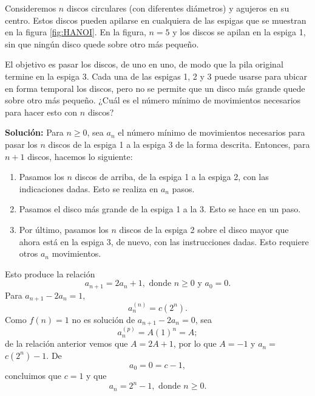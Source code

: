 \begin{myexample}
    Consideremos $n$ discos circulares (con diferentes diámetros) y agujeros en su centro. Estos discos pueden apilarse en cualquiera de las espigas que se muestran en la figura \ref{fig:HANOI}. En la figura, $n = 5$ y los discos se apilan en la espiga 1, sin que ningún disco quede sobre otro más pequeño.
    \begin{center}
         \label{fig:HANOI}
    \end{center}
    El objetivo es pasar los discos, de uno en uno, de modo que la pila original termine en la espiga 3. Cada una de las espigas 1, 2 y 3 puede usarse para ubicar en forma temporal los discos, pero no se permite que un disco más grande quede sobre otro más pequeño. ¿Cuál es el número mínimo de movimientos necesarios para hacer esto con $n$ discos?

    \tcblower
    \textbf{\color{jblueleft}Solución:} Para $n \geq 0$, sea $a_n$ el número mínimo de movimientos necesarios para pasar los $n$ discos de la espiga 1 a la espiga 3 de la forma descrita. Entonces, para $n + 1$ discos, hacemos lo siguiente:
    \begin{enumerate}[label=\alph*)]
        \item Pasamos los $n$ discos de arriba, de la espiga 1 a la espiga 2, con las indicaciones dadas. Esto se realiza en $a_n$ pasos.
        \item Pasamos el disco más grande de la espiga 1 a la 3. Esto se hace en un paso.
        \item Por último, pasamos los $n$ discos de la espiga 2 sobre el disco mayor que ahora está en la espiga 3, de nuevo, con las instrucciones dadas. Esto requiere otros $a_n$ movimientos.
    \end{enumerate}
    Esto produce la relación
    $$a_{n+1}=2 a_n+1, \text{ donde } n \geq 0 \text{ y } a_0=0.$$
    Para $a_{n+1}-2 a_n=1$,
    $$a_n^{(n)}=c\left(2^n\right).$$
    Como $f(n)=1$ no es solución de $a_{n+1}-2 a_n=0$, sea
    $$a_n^{(p)}=A(1)^n=A;$$
    de la relación anterior vemos que $A=2 A+1$, por lo que $A=-1$ y $a_n=$ $c\left(2^n\right)-1$. De
    $$a_0 = 0 = c - 1,$$
    concluimos que $c=1$ y que
    $$a_n=2^n-1, \text{ donde } n \geq 0.$$
\end{myexample}

